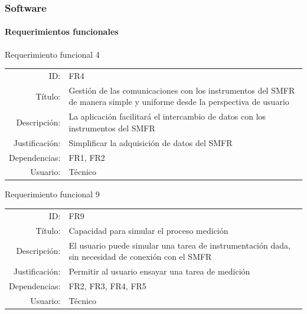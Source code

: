 \documentclass[xcolor=pdftext, table]{beamer}
\begin{document}
	\begin{frame} 
		\frametitle{Software}
		\framesubtitle{Requerimientos funcionales}	
		
		\begin{block}{Requerimiento funcional 4}
			\begin{table}
				\tiny
				\begin{tabular}{rp{10cm}}	
					{ID:} & {FR4} \\
					{Título:} & {Gestión de las comunicaciones con los instrumentos del SMFR de manera simple y uniforme desde la perspectiva de usuario} \\
					{Descripción:} & {La aplicación facilitará el intercambio de datos con los instrumentos del SMFR} \\
					{Justificación:} & {Simplificar la adquisición de datos del SMFR} \\
					{Dependencias:} & {FR1, FR2} \\
					{Usuario:} & {Técnico}	
				\end{tabular}
			\end{table}			
		\end{block}			
		

		\begin{block}{Requerimiento funcional 9}
			\begin{table}
				\tiny
				\begin{tabular}{rp{10cm}}	
					{ID:} & {FR9} \\
					{Título:} & {Capacidad para simular el proceso medición} \\
					{Descripción:} & {El usuario puede simular una tarea de instrumentación dada, sin necesidad de conexión con el SMFR} \\
					{Justificación:} & {Permitir al usuario ensayar una tarea de medición} \\
					{Dependencias:} & {FR2, FR3, FR4, FR5} \\
					{Usuario:} & {Técnico} \\
				\end{tabular}
			\end{table}			
		\end{block}		

	\end{frame}
\end{document}

